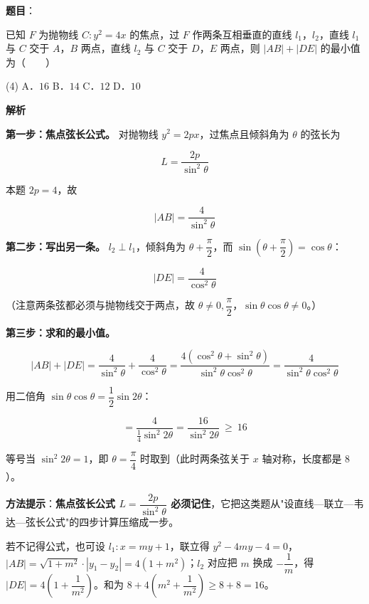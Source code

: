 \begin{answer}

\textbf{题目}：

已知 $F$ 为抛物线 $C:y^{2}=4x$ 的焦点，过 $F$ 作两条互相垂直的直线 $l_1$，$l_2$，直线 $l_1$ 与 $C$ 交于 $A$，$B$ 两点，直线 $l_2$ 与 $C$ 交于 $D$，$E$ 两点，则 $|AB|+|DE|$ 的最小值为\mbox{（　　）}

\begin{gkopts}(4)
\task A．$16$
\task B．$14$
\task C．$12$
\task D．$10$
\end{gkopts}

\textbf{解析}

\textbf{第一步：焦点弦长公式。} 对抛物线 $y^{2}=2px$，过焦点且倾斜角为 $\theta$ 的弦长为

\nopagebreak[4]
\[L=\frac{2p}{\sin^{2}\theta}\]

本题 $2p=4$，故

\nopagebreak[4]
\[|AB|=\frac4{\sin^{2}\theta}\]

\textbf{第二步：写出另一条。} $l_2\perp l_1$，倾斜角为 $\theta+\dfrac\pi2$，而 $\sin\left(\theta+\dfrac\pi2\right)=\cos\theta$：

\nopagebreak[4]
\[|DE|=\frac4{\cos^{2}\theta}\]

（注意两条弦都必须与抛物线交于两点，故 $\theta\ne0,\dfrac\pi2$，$\sin\theta\cos\theta\ne0$。）

\textbf{第三步：求和的最小值。}

\nopagebreak[4]
\[|AB|+|DE|=\frac4{\sin^{2}\theta}+\frac4{\cos^{2}\theta}=\frac{4\left(\cos^{2}\theta+\sin^{2}\theta\right)}{\sin^{2}\theta\cos^{2}\theta}=\frac4{\sin^{2}\theta\cos^{2}\theta}\]

用二倍角 $\sin\theta\cos\theta=\dfrac12\sin2\theta$：

\nopagebreak[4]
\[=\frac4{\frac14\sin^{2}2\theta}=\frac{16}{\sin^{2}2\theta}\ \ge\ 16\]

等号当 $\sin^{2}2\theta=1$，即 $\theta=\dfrac\pi4$ 时取到（此时两条弦关于 $x$ 轴对称，长度都是 $8$）。

\begin{gktip}
\textbf{方法提示}：\textbf{焦点弦长公式 $L=\dfrac{2p}{\sin^{2}\theta}$ 必须记住}，它把这类题从"设直线—联立—韦达—弦长公式"的四步计算压缩成一步。

若不记得公式，也可设 $l_1:x=my+1$，联立得 $y^{2}-4my-4=0$，$|AB|=\sqrt{1+m^{2}}\cdot\left|y_1-y_2\right|=4\left(1+m^{2}\right)$；$l_2$ 对应把 $m$ 换成 $-\dfrac1m$，得 $|DE|=4\left(1+\dfrac1{m^{2}}\right)$。和为 $8+4\left(m^{2}+\dfrac1{m^{2}}\right)\ge8+8=16$。
\end{gktip}


\par\medskip

\end{answer}
